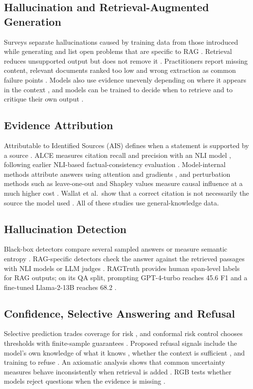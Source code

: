 \documentclass[conference]{IEEEtran}
\begin{document}
\subsection{Hallucination and Retrieval-Augmented Generation}
Surveys separate hallucinations caused by training data from those introduced while generating \cite{ji2023survey} and list open problems that are
specific to RAG \cite{huang2025survey}. Retrieval reduces unsupported output but does not remove it \cite{lewis2020rag,magesh2025legal}. Practitioners
report missing content, relevant documents ranked too low and wrong extraction as common failure points \cite{barnett2024seven}. Models also use
evidence unevenly depending on where it appears in the context \cite{liu2024lost}, and models can be trained to decide when to retrieve and to
critique their own output \cite{asai2024selfrag}.

\subsection{Evidence Attribution}
Attributable to Identified Sources (AIS) defines when a statement is supported by a source \cite{rashkin2023ais}. ALCE measures citation recall and
precision with an NLI model \cite{gao2023alce}, following earlier NLI-based factual-consistency evaluation \cite{honovich2022true}. Model-internal
methods attribute answers using attention and gradients \cite{qi2024mirage}, and perturbation methods such as leave-one-out and Shapley values measure
causal influence at a much higher cost \cite{nematov2025source}. Wallat et al.\ show that a correct citation is not necessarily the source the model
used \cite{wallat2025correctness}. All of these studies use general-knowledge data.

\subsection{Hallucination Detection}
Black-box detectors compare several sampled answers \cite{manakul2023selfcheck} or measure semantic entropy \cite{farquhar2024semantic}. RAG-specific
detectors check the answer against the retrieved passages with NLI models or LLM judges \cite{es2024ragas}. RAGTruth provides human span-level labels
for RAG outputs; on its QA split, prompting GPT-4-turbo reaches 45.6 F1 and a fine-tuned Llama-2-13B reaches 68.2 \cite{niu2024ragtruth}.

\subsection{Confidence, Selective Answering and Refusal}
Selective prediction trades coverage for risk \cite{geifman2017selective,geifman2019bias}, and conformal risk control chooses thresholds with
finite-sample guarantees \cite{angelopoulos2024crc}. Proposed refusal signals include the model's own knowledge of what it knows \cite{kadavath2022know},
whether the context is sufficient \cite{joren2025sufficient}, and training to refuse \cite{song2025trust}. An axiomatic analysis shows that common
uncertainty measures behave inconsistently when retrieval is added \cite{soudani2025uncertainty}. RGB tests whether models reject questions when the
evidence is missing \cite{chen2024rgb}.
\end{document}
